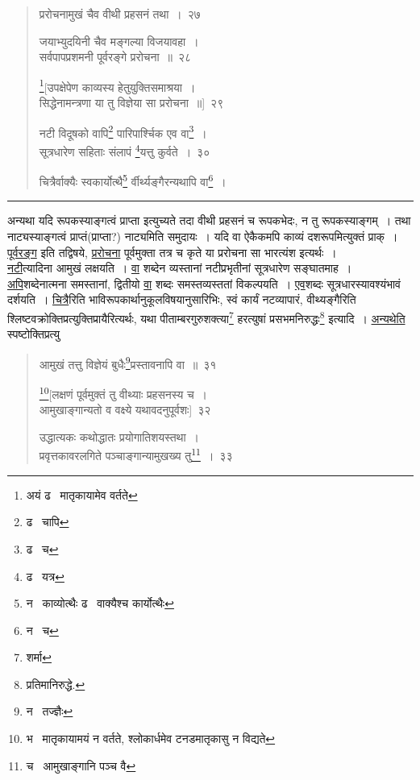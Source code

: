 \documentclass[11pt, openany]{book}
\begin{document}
\newpage

\begin{quote}
{\na प्ररोचनामुखं चैव वीथी प्रहसनं तथा~।~२७

जयाभ्युदयिनी चैव मङ्गल्या विजयावहा~।\\
सर्वपापप्रशमनी पूर्वरङ्गे प्ररोचना~॥~२८

\renewcommand{\thefootnote}{1}\footnote{अयं ढ \textendash\ मातृकायामेव वर्तते}[उपक्षेपेण काव्यस्य हेतुयुक्तिसमाश्रया~।\\
सिद्धेनामन्त्रणा या तु विज्ञेया सा प्ररोचना~॥]~२९

नटी विदूषको वापि\renewcommand{\thefootnote}{2}\footnote{ढ \textendash\ चापि} पारिपार्श्चिक एव वा\renewcommand{\thefootnote}{3}\footnote{ढ \textendash\ च}~।\\
सूत्रधारेण सहिताः संलापं \renewcommand{\thefootnote}{4}\footnote{ढ \textendash\ यत्र}यत्तु कुर्वते~।~३०

चित्रैर्वाक्यैः स्वकार्योत्थै\renewcommand{\thefootnote}{5}\footnote{न \textendash\ काव्योत्थैः ढ \textendash\ वाक्यैश्च कार्योत्थैः} र्वीर्थ्यङ्गैरन्यथापि वा\renewcommand{\thefootnote}{6}\footnote{न \textendash\ च}~।}
\end{quote}

\hrule

\vspace{2mm}
\noindent
अन्यथा यदि रूपकस्याङ्गत्वं प्राप्ता इत्युच्यते तदा वीथी प्रहसनं च रूपकभेदः, न तु रूपकस्याङ्गम्~। तथा नाट्यस्याङ्गत्वं प्राप्तं(प्राप्ता?) नाट्यमिति समुदायः~। यदि वा ऐकैकमपि काव्यं दशरूपमित्युक्तं प्राक्~। \underline{पूर्वरङ्ग} इति तद्विषये, \underline{प्ररोचना} पूर्वमुक्ता तत्र च कृते या प्ररोचना सा भारत्यंश इत्यर्थः~।\\

\underline{नटी}त्यादिना आमुखं लक्षयति~। \underline{वा} शब्देन व्यस्तानां नटीप्रभृतीनां सूत्रधारेण सङ्घातमाह~। \underline{अपि}शब्देनात्मना समस्तानां, द्वितीयो \underline{वा} शब्दः समस्तव्यस्ततां विकल्पयति~। \underline{एव}शब्दः सूत्रधारस्यावश्यंभावं दर्शयति~। \underline{चित्रै}रिति भाविरूपकार्थानुकूलविषयानुसारिभिः, स्वं कार्यं नटव्यापारं, वीथ्यङ्गैरिति श्लिष्टवक्रोक्तिप्रत्युक्तिप्रायैरित्यर्थः, यथा {\qt पीताम्बरगुरुशक्त्या\renewcommand{\thefootnote}{1}\footnote{शर्मा} हरत्युषां प्रसभमनिरुद्धः}\renewcommand{\thefootnote}{*}\footnote{प्रतिमानिरुद्धे.} इत्यादि~। \underline{अन्यथेति} स्पष्टोक्तिप्रत्यु\textendash

\newpage

\begin{quote}
{\na आमुखं तत्तु विज्ञेयं बुधैः\renewcommand{\thefootnote}{1}\footnote{न \textendash\ तज्ज्ञैः}प्रस्तावनापि वा~॥~३१

\renewcommand{\thefootnote}{2}\footnote{भ \textendash\ मातृकायामयं न वर्तते, श्लोकार्धमेव टनडमातृकासु न विद्यते}[लक्षणं पूर्वमुक्तं तु वीथ्याः प्रहसनस्य च~।\\
आमुखाङ्गान्यतो व वक्ष्ये यथावदनुपूर्वशः]~३२

उद्धात्यकः कथोद्धातः प्रयोगातिशयस्तथा~।\\
प्रवृत्तकावरलगिते पञ्चाङ्गान्यामुखख्य तु\renewcommand{\thefootnote}{3}\footnote{च \textendash\ आमुखाङ्गानि पञ्च वै}~।~३३}
\end{quote}
\end{document}
